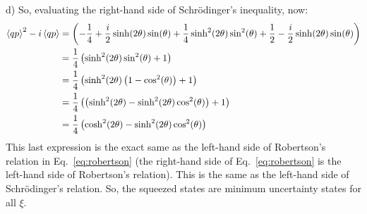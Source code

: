 \begin{homeworkProblem}[Problem 10]
\begin{homeworkSection}{d)}
So, evaluating the right-hand side of Schr\"{o}dinger's inequality, now:
\begin{align}
   \braket{qp}^2 - i \braket{qp} &=
   \left( - \frac{1}{4} + \frac{i}{2} \sinh(2\theta) \sin(\theta) +
   \frac{1}{4} \sinh^2(2\theta)\sin^2(\theta) + \frac{1}{2} - \frac{i}{2} \sinh(2\theta)\sin(\theta) \right)
   \\
   &= \frac{1}{4} \left( \sinh^2(2\theta) \sin^2(\theta) + 1 \right) \\
   &= \frac{1}{4} \left( \sinh^2(2\theta) \left( 1 - \cos^2(\theta) \right) + 1
\right) \\
   &= \frac{1}{4} \left( \left( \sinh^2(2\theta) - \sinh^2(2\theta)
   \cos^2(\theta) \right) + 1 \right) \\
   &= \frac{1}{4} \left( \cosh^2(2\theta) - \sinh^2(2\theta) \cos^2(\theta) \right)
\end{align}
This last expression is the exact same as the left-hand side of Robertson's
relation in Eq.~\ref{eq:robertson} (the right-hand side of
Eq.~\ref{eq:robertson} is the left-hand side of Robertson's relation). This is
the same as the left-hand side of Schr\"{o}dinger's relation. So, the squeezed
states are minimum uncertainty states for all $ \xi $.
\end{homeworkSection}
\end{homeworkProblem}
